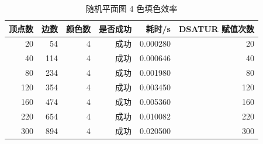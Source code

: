 \documentclass[UTF8,a4paper,12pt]{ctexart}
\begin{document}
\begin{table}[h]
\centering
\caption{随机平面图 4 色填色效率}
\begin{tabular}{rrrrrr}
\toprule
顶点数 & 边数 & 颜色数 & 是否成功 & 耗时/s & DSATUR 赋值次数 \\
\midrule
20  & 54  & 4 & 成功 & 0.000280 & 20 \\
40  & 114 & 4 & 成功 & 0.000646 & 40 \\
80  & 234 & 4 & 成功 & 0.001980 & 80 \\
120 & 354 & 4 & 成功 & 0.003450 & 120 \\
160 & 474 & 4 & 成功 & 0.005360 & 160 \\
220 & 654 & 4 & 成功 & 0.010082 & 220 \\
300 & 894 & 4 & 成功 & 0.020500 & 300 \\
\bottomrule
\end{tabular}
\end{table}
\end{document}
